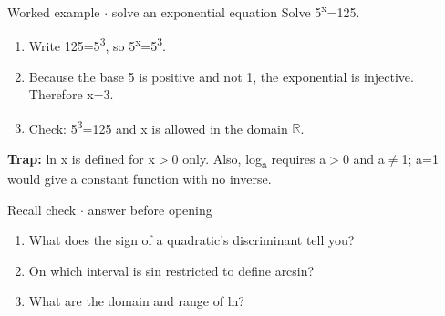 \documentclass[11pt]{article}
\begin{document}
\begin{keepsection}
\begin{keepsection}
\begin{workedbox}{Worked example \ensuremath{\cdot} solve an exponential equation}
Solve 5\textsuperscript{x}=125.

\begin{enumerate}
\item Write 125=5\textsuperscript{3}, so 5\textsuperscript{x}=5\textsuperscript{3}.
\item Because the base 5 is positive and not 1, the exponential is injective. Therefore x=3.
\item Check: 5\textsuperscript{3}=125 and x is allowed in the domain \ensuremath{\mathbb{R}}.
\end{enumerate}
\end{workedbox}

\begin{notebox}\textbf{Trap:} ln x is defined for x\ensuremath{>}0 only. Also, log\textsubscript{a} requires a\ensuremath{>}0 and a\ensuremath{\neq}1; a=1 would give a constant function with no inverse.\end{notebox}

\begin{recallbox}{Recall check \ensuremath{\cdot} answer before opening}
\begin{enumerate}
\item What does the sign of a quadratic’s discriminant tell you?
\item On which interval is sin restricted to define arcsin?
\item What are the domain and range of ln?
\end{enumerate}

\end{recallbox}
\end{keepsection}
\end{keepsection}
\end{document}
